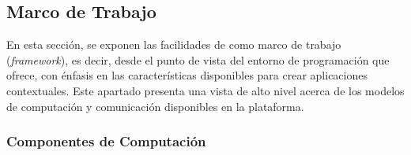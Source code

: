 \subsection{Marco de Trabajo}

\label{ssec52:framework}En esta sección, se exponen las facilidades
de  como marco de trabajo (\emph{framework}), es decir,
desde el punto de vista del entorno de programación que ofrece, con
énfasis en las características disponibles para crear aplicaciones
contextuales. Este apartado presenta una vista de alto nivel acerca
de los modelos de computación y comunicación disponibles en la plataforma.

\subsubsection{Componentes de Computación}

